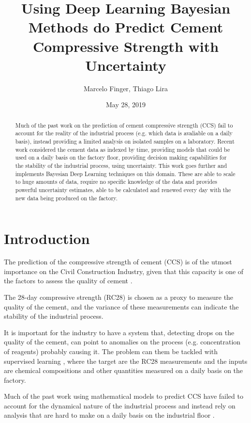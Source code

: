 \documentclass[11pt]{article}
\author{Marcelo Finger, Thiago Lira}
\date{May 28, 2019}
\title{Using Deep Learning Bayesian Methods do Predict Cement Compressive Strength with Uncertainty}
\begin{document}
\maketitle
\begin{abstract}
Much of the past work on the prediction of cement compressive strength (CCS) fail to account for the reality of the industrial process (e.g. which data is avaliable on a daily basis),
instead providing a limited analysis on isolated samples on a laboratory. Recent work considered the cement data as indexed by time, providing 
models that could be used on a daily basis on the factory floor, providing decision making capabilities for the stability of the industrial process, using uncertainty.
This work goes further and implements Bayesian Deep Learning techniques on this domain. These are able to scale to huge amounts of data, require no
specific knowledge of the data and provides powerful uncertainty estimates, able to be calculated and renewed every day with the new data being produced on the factory.
\end{abstract}


\section{Introduction}
\label{sec:org279a5fb}
The prediction of the compressive strength of cement (CCS) is of the utmost importance on the Civil Construction Industry, 
given that this capacity is one of the factors to assess the quality of cement \cite{cementnn0}.

The 28-day compressive strength (RC28) is chosen as a proxy to measure the quality of the cement, and the variance of these measurements can indicate the stability of the industrial process. 

It is important for the industry to have a system that, detecting drops on the quality of the cement, can point to anomalies on the process (e.g. concentration of reagents) 
probably causing it. The problem can them be tackled with supervised learning \cite{dlbook}, where the target are the RC28 measurements and the inputs are chemical compositions and other 
quantities measured on a daily basis on the factory.

Much of the past work \cite{cementlin,nncement} using mathematical models to predict CCS have failed to account for the dynamical nature of the industrial process and instead rely on analysis that are hard to make 
on a daily basis on the industrial floor \cite{dynstat}. 
\end{document}
